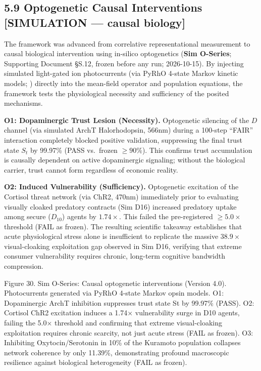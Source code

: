 \documentclass[
]{article}
\begin{document}
\subsection{5.9 Optogenetic Causal Interventions {[}SIMULATION ---
causal
biology{]}}\label{optogenetic-causal-interventions-simulation-causal-biology}

The framework was advanced from correlative representational measurement
to causal biological intervention using in-silico optogenetics
(\textbf{Sim O-Series}; Supporting Document §S.12, frozen before any
run; 2026-10-15). By injecting simulated light-gated ion photocurrents
(via PyRhO 4-state Markov kinetic models; ) directly into the mean-field
operator and population equations, the framework tests the physiological
necessity and sufficiency of the posited mechanisms.

\textbf{O1: Dopaminergic Trust Lesion (Necessity).} Optogenetic
silencing of the \(D\) channel (via simulated ArchT Halorhodopsin,
566nm) during a 100-step ``FAIR'' interaction completely blocked
positive validation, suppressing the final trust state \(S_t\) by
99.97\% (PASS vs.~frozen \(\ge 90\%\)). This confirms trust accumulation
is causally dependent on active dopaminergic signaling; without the
biological carrier, trust cannot form regardless of economic reality.

\textbf{O2: Induced Vulnerability (Sufficiency).} Optogenetic excitation
of the Cortisol threat network (via ChR2, 470nm) immediately prior to
evaluating visually cloaked predatory contracts (Sim D16) increased
predatory uptake among secure (\(D_{10}\)) agents by \(1.74\times\).
This failed the pre-registered \(\ge 5.0\times\) threshold (FAIL as
frozen). The resulting scientific takeaway establishes that acute
physiological stress alone is insufficient to replicate the massive
\(38.9\times\) visual-cloaking exploitation gap observed in Sim D16,
verifying that extreme consumer vulnerability requires chronic,
long-term cognitive bandwidth compression.

Figure 30. Sim O-Series: Causal optogenetic interventions (Version 4.0).
Photocurrents generated via PyRhO 4-state Markov opsin models. O1:
Dopaminergic ArchT inhibition suppresses trust state {St} by 99.97\%
(PASS). O2: Cortisol ChR2 excitation induces a {1.74×} vulnerability
surge in {D10} agents, failing the {5.0×} threshold and confirming that
extreme visual-cloaking exploitation requires chronic scarcity, not just
acute stress (FAIL as frozen). O3: Inhibiting Oxytocin/Serotonin in 10\%
of the Kuramoto population collapses network coherence by only 11.39\%,
demonstrating profound macroscopic resilience against biological
heterogeneity (FAIL as frozen).
\end{document}
